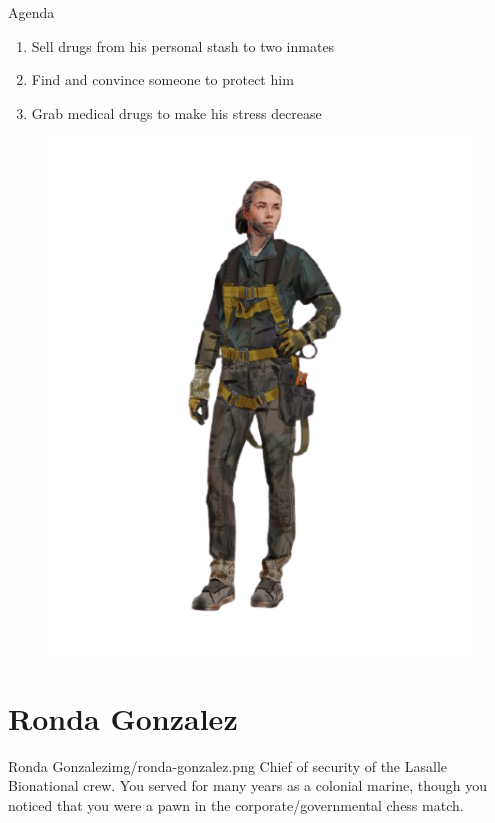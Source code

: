 \begin{rpg-commentbox}{Agenda}
    \begin{enumerate}[label=\textbf{Act \arabic*}, leftmargin=1cm]
        \item Sell drugs from his personal stash to two inmates
        \item Find and convince someone to protect him
        \item Grab medical drugs to make his stress decrease
    \end{enumerate}
\end{rpg-commentbox}


\begin{figure}
    \hspace*{-1in}
    \includegraphics[width=.7\textwidth]{img/bg/firefighter-5.png}
    \label{fig:refinery}
\end{figure}


\clearpage

\section{Ronda Gonzalez}

\begin{rpg-pcbox}{Ronda Gonzalez}{img/ronda-gonzalez.png}
    Chief of security of the Lasalle Bionational crew. You served for many years as a colonial marine, though you noticed that you were a pawn in the corporate/governmental chess match.
\end{rpg-pcbox}

